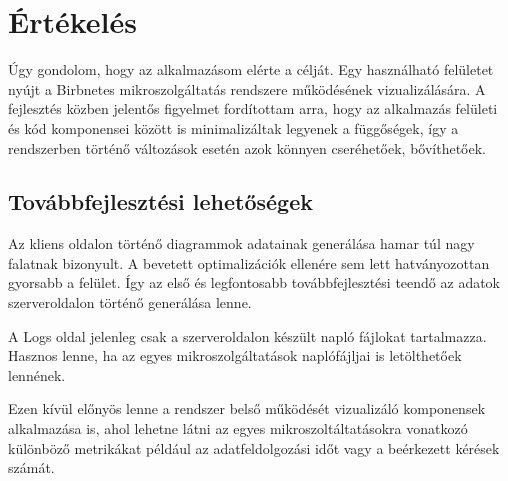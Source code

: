 \chapter{Értékelés}
\label{chapt:summary}
Úgy gondolom, hogy az alkalmazásom elérte a célját.
Egy használható felületet nyújt a Birbnetes mikroszolgáltatás rendszere működésének vizualizálására.
A fejlesztés közben jelentős figyelmet fordítottam arra, hogy az alkalmazás felületi és kód komponensei között is
minimalizáltak legyenek a függőségek, így a rendszerben történő változások esetén azok könnyen cseréhetőek, bővíthetőek.
\section{Továbbfejlesztési lehetőségek}
Az kliens oldalon történő diagrammok adatainak generálása hamar túl nagy falatnak bizonyult.
A bevetett optimalizációk ellenére sem lett hatványozottan gyorsabb a felület.
Így az első és legfontosabb továbbfejlesztési teendő az adatok szerveroldalon történő generálása lenne.

A Logs oldal jelenleg csak a szerveroldalon készült napló fájlokat tartalmazza.
Hasznos lenne, ha az egyes mikroszolgáltatások naplófájljai is letölthetőek lennének.

Ezen kívül előnyös lenne a rendszer belső működését vizualizáló komponensek alkalmazása is, 
ahol lehetne látni az egyes mikroszoltáltatásokra vonatkozó különböző metrikákat például az adatfeldolgozási időt vagy a beérkezett kérések számát. 